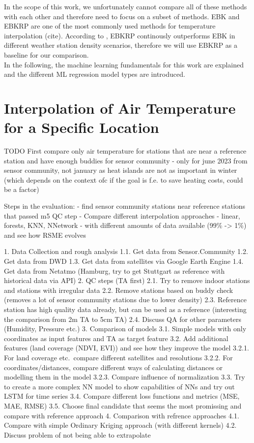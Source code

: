 In the scope of this work, we unfortunately cannot compare all of these methods with each other and therefore need to focus on a subset of methods. EBK and EBKRP are one of the most commonly used methods for temperature interpolation (cite). According to \cite{njoku2023effects}, EBKRP continously outperforms EBK in different weather station density scenarios, therefore we will use EBKRP as a baseline for our comparison.\\
In the following, the machine learning fundamentals for this work are explained and the different ML regression model types are introduced.

\section{Interpolation of Air Temperature for a Specific Location}


TODO
First compare only air temperature for stations that are near a reference station and have enough buddies for sensor community
- only for june 2023 from sensor community, not january as heat islands are not as important in winter (which depends on the context ofc if the goal is f.e. to save heating costs, could be a factor)

Steps in the evaluation:
- find sensor community stations near reference stations that passed m5 QC step
- Compare different interpolation approaches
  - linear, forests, KNN, NNetwork
  - with different amounts of data available (99\% -> 1\%) and see how RSME evolves

1. Data Collection and rough analysis
  1.1. Get data from Sensor.Community
  1.2. Get data from DWD
  1.3. Get data from satellites via Google Earth Engine
  1.4. Get data from Netatmo (Hamburg, try to get Stuttgart as reference with historical data via API)
2. QC steps (TA first)
  2.1. Try to remove indoor stations and stations with irregular data
  2.2. Remove stations based on buddy check (removes a lot of sensor community stations due to lower density)
  2.3. Reference station has high quality data already, but can be used as a reference (interesting the comparison from 2m TA to 5cm TA)
  2.4. Discuss QA for other parameters (Humidity, Pressure etc.)
3. Comparison of models
  3.1. Simple models with only coordinates as input features and TA as target feature
  3.2. Add additional features (land coverage (NDVI, EVI)) and see how they improve the model
    3.2.1. For land coverage etc.\ compare different satellites and resolutions
    3.2.2. For coordinates/distances, compare different ways of calculating distances or modelling them in the model
    3.2.3. Compare influence of normalization
  3.3. Try to create a more complex NN model to show capabilities of NNs and try out LSTM for time series
  3.4. Compare different loss functions and metrics (MSE, MAE, RMSE)
  3.5. Choose final candidate that seems the most promissing and compare with reference approach
4. Comparison with refrence approaches
  4.1. Compare with simple Ordinary Kriging approach (with different kernels)
  4.2. Discuss problem of not being able to extrapolate




